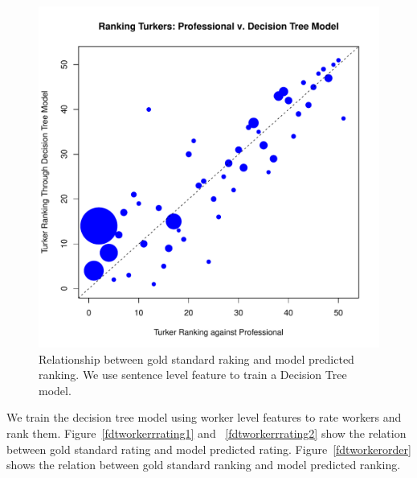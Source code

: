\documentclass[11pt]{article}
\begin{document}
\begin{figure}[htbp]
  \centering
  \includegraphics[width=\linewidth]{Senfeature/senroederDT}
  \caption{Relationship between gold standard raking and model predicted ranking. We use sentence level feature to train a Decision Tree model. }
    \label{fdtsenrorder}
\end{figure}
We train the decision tree model using worker level features to rate workers and rank them. Figure~\ref{fdtworkerrrating1} and ~\ref{fdtworkerrrating2} show the relation between gold standard rating and model predicted rating. Figure~\ref{fdtworkerorder} shows the relation between gold standard ranking and model predicted ranking.
\end{document}
